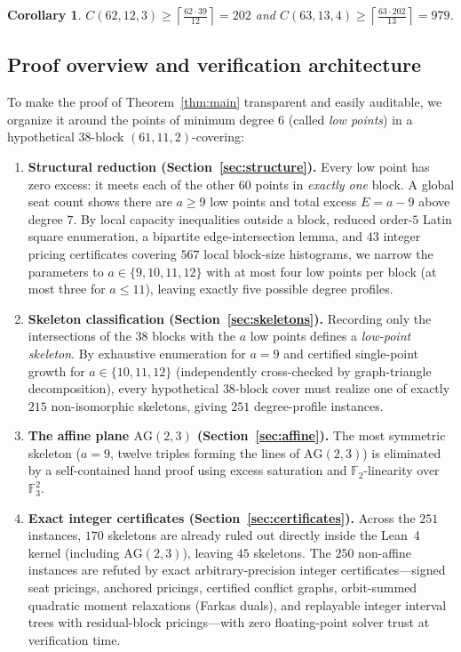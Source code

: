 \documentclass[11pt,a4paper]{article}
\newtheorem{corollary}[theorem]{Corollary}
\theoremstyle{definition}
\theoremstyle{remark}
\newcommand{\AG}{\mathrm{AG}}
\newcommand{\F}{\mathbb{F}}
\begin{document}
\begin{corollary}\label{cor:cascade}
  $C(62,12,3) \ge \left\lceil \frac{62 \cdot 39}{12} \right\rceil = 202$ and $C(63,13,4) \ge \left\lceil \frac{63 \cdot 202}{13} \right\rceil = 979$.
\end{corollary}

\subsection{Proof overview and verification architecture}

To make the proof of Theorem~\ref{thm:main} transparent and easily auditable, we organize it around the points of minimum degree $6$ (called \emph{low points}) in a hypothetical $38$-block $(61,11,2)$-covering:
\begin{enumerate}
  \item \textbf{Structural reduction (Section~\ref{sec:structure}).} Every low point has zero excess: it meets each of the other $60$ points in \emph{exactly one} block. A global seat count shows there are $a \ge 9$ low points and total excess $E = a - 9$ above degree $7$. By local capacity inequalities outside a block, reduced order-$5$ Latin square enumeration, a bipartite edge-intersection lemma, and $43$ integer pricing certificates covering $567$ local block-size histograms, we narrow the parameters to $a \in \{9,10,11,12\}$ with at most four low points per block (at most three for $a \le 11$), leaving exactly five possible degree profiles.
  \item \textbf{Skeleton classification (Section~\ref{sec:skeletons}).} Recording only the intersections of the $38$ blocks with the $a$ low points defines a \emph{low-point skeleton}. By exhaustive enumeration for $a=9$ and certified single-point growth for $a \in \{10,11,12\}$ (independently cross-checked by graph-triangle decomposition), every hypothetical $38$-block cover must realize one of exactly $215$ non-isomorphic skeletons, giving $251$ degree-profile instances.
  \item \textbf{The affine plane $\AG(2,3)$ (Section~\ref{sec:affine}).} The most symmetric skeleton ($a=9$, twelve triples forming the lines of $\AG(2,3)$) is eliminated by a self-contained hand proof using excess saturation and $\F_2$-linearity over $\F_3^2$.
  \item \textbf{Exact integer certificates (Section~\ref{sec:certificates}).} Across the $251$ instances, $170$ skeletons are already ruled out directly inside the Lean~4 kernel (including $\AG(2,3)$), leaving $45$ skeletons. The $250$ non-affine instances are refuted by exact arbitrary-precision integer certificates—signed seat pricings, anchored pricings, certified conflict graphs, orbit-summed quadratic moment relaxations (Farkas duals), and replayable integer interval trees with residual-block pricings—with zero floating-point solver trust at verification time.
\end{enumerate}
\end{document}
